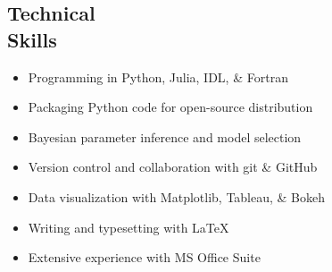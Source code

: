 \documentclass[margin,10pt]{res}
\begin{document}
\begin{resume}
\section{Technical \\Skills} 
                \begin{itemize}  \itemsep -1pt %
                    \item Programming in Python, Julia, IDL, \& Fortran
                    \item Packaging Python code for open-source distribution
                    \item Bayesian parameter inference and model selection 
                    \item Version control and collaboration with git \& GitHub
                    \item Data visualization with Matplotlib, Tableau, \& Bokeh  
                    \item Writing and typesetting with \LaTeX 
                    \item Extensive experience with MS Office Suite \\
                \end{itemize}


\end{resume}
\end{document}
